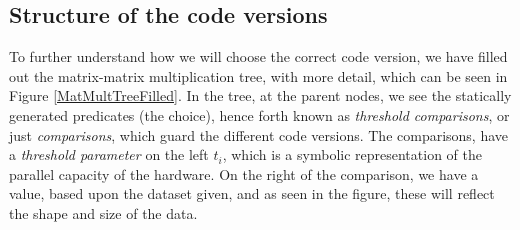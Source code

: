 \subsection{Structure of the code versions}
To further understand how we will choose the correct code version, we have filled out the matrix-matrix multiplication tree, with more detail, which can be seen in Figure \ref{MatMultTreeFilled}. In the tree, at the parent nodes, we see the statically generated predicates (the choice), hence forth known as \textit{threshold comparisons}, or just \textit{comparisons}, which guard the different code versions. The comparisons, have a \textit{threshold parameter} on the left $t_i$, which is a symbolic representation of the parallel capacity of the hardware. On the right of the comparison, we have a value, based upon the dataset given, and as seen in the figure, these will reflect the shape and size of the data.

